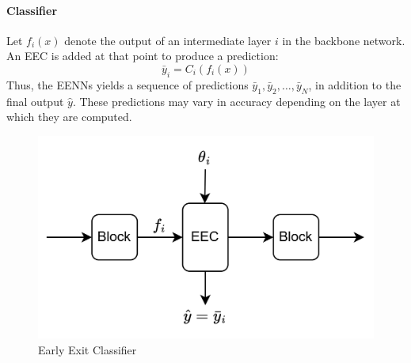 \paragraph*{Classifier}
Let $f_i(x)$ denote the output of an intermediate layer $i$ in the backbone network.
An EEC is added at that point to produce a prediction:
\[\bar{y}_i=C_i(f_i(x))\]
Thus, the EENNs yields a sequence of predictions $\bar{y}_1,\bar{y}_2,\dots,\bar{y}_N$, in addition to the final output $\hat{y}$.
These predictions may vary in accuracy depending on the layer at which they are computed.
\begin{figure}[H]
    \centering
    \includegraphics[width=0.5\linewidth]{images/eeai11.png}
    \caption{Early Exit Classifier}
\end{figure}

